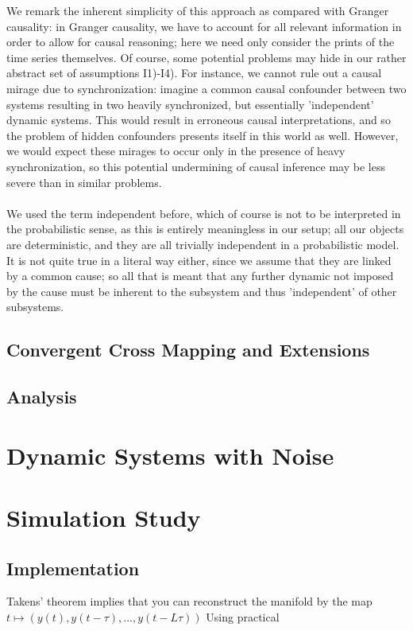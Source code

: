 \documentclass[11pt, a4paper]{memoir}
\theoremstyle{break}
\theoremstyle{break}
\theoremstyle{nonumberplain}
\begin{document}
We remark the inherent simplicity of this approach as compared with Granger causality: in Granger causality, we have to account for all relevant information in order to allow for causal reasoning; here we need only consider the prints of the time series themselves. Of course, some potential problems may hide in our rather abstract set of assumptions I1)-I4). For instance, we cannot rule out a causal mirage due to synchronization: imagine a common causal confounder between two systems resulting in two heavily synchronized, but essentially 'independent' dynamic systems. This would result in erroneous causal interpretations, and so the problem of hidden confounders presents itself in this world as well. However, we would expect these mirages to occur only in the presence of heavy synchronization, so this potential undermining of causal inference may be less severe than in similar problems.\\\\ 
We used the term independent before, which of course is not to be interpreted in the probabilistic sense, as this is entirely meaningless in our setup; all our objects are deterministic, and they are all trivially independent in a probabilistic model. It is not quite true in a literal way either, since we assume that they are linked by a common cause; so all  that is meant that any further dynamic not imposed by the cause must be inherent to the subsystem and thus 'independent' of other subsystems.

\section{Convergent Cross Mapping and Extensions}

\section{Analysis}


\chapter{Dynamic Systems with Noise}
 



\chapter{Simulation Study}
\section{Implementation}
Takens' theorem implies that you can reconstruct the manifold by the map
$t\mapsto (y(t),y(t-\tau),...,y(t-L\tau))$
Using practical  
\end{document}
